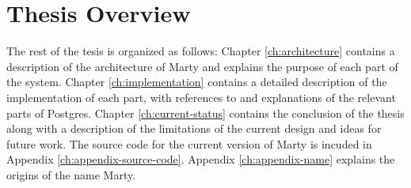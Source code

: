 \section{Thesis Overview}
The rest of the tesis is organized as follows: Chapter \ref{ch:architecture} contains a description of the architecture of Marty and explains the purpose of each part of the system.
Chapter \ref{ch:implementation} contains a detailed description of the implementation of each part, with references to and explanations of the relevant parts of Postgres.
Chapter \ref{ch:current-status} contains the conclusion of the thesis along with a description of the limitations of the current design and ideas for future work.
The source code for the current version of Marty is incuded in Appendix \ref{ch:appendix-source-code}.
Appendix \ref{ch:appendix-name} explains the origins of the name Marty.
